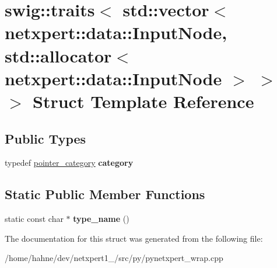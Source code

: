 \hypertarget{structswig_1_1traits_3_01std_1_1vector_3_01netxpert_1_1data_1_1InputNode_00_01std_1_1allocator_30485a0de76e92f94d67a422e53827774}{}\section{swig\+:\+:traits$<$ std\+:\+:vector$<$ netxpert\+:\+:data\+:\+:Input\+Node, std\+:\+:allocator$<$ netxpert\+:\+:data\+:\+:Input\+Node $>$ $>$ $>$ Struct Template Reference}
\label{structswig_1_1traits_3_01std_1_1vector_3_01netxpert_1_1data_1_1InputNode_00_01std_1_1allocator_30485a0de76e92f94d67a422e53827774}
\subsection*{Public Types}
\begin{DoxyCompactItemize}
\item 
typedef \hyperlink{structswig_1_1pointer__category}{pointer\+\_\+category} {\bfseries category}\hypertarget{structswig_1_1traits_3_01std_1_1vector_3_01netxpert_1_1data_1_1InputNode_00_01std_1_1allocator_30485a0de76e92f94d67a422e53827774_a1fb5a01f48bfc643e38da14af39be328}{}\label{structswig_1_1traits_3_01std_1_1vector_3_01netxpert_1_1data_1_1InputNode_00_01std_1_1allocator_30485a0de76e92f94d67a422e53827774_a1fb5a01f48bfc643e38da14af39be328}

\end{DoxyCompactItemize}
\subsection*{Static Public Member Functions}
\begin{DoxyCompactItemize}
\item 
static const char $\ast$ {\bfseries type\+\_\+name} ()\hypertarget{structswig_1_1traits_3_01std_1_1vector_3_01netxpert_1_1data_1_1InputNode_00_01std_1_1allocator_30485a0de76e92f94d67a422e53827774_ae3cfe70fb47c4ab81f92fb4e10f3fa26}{}\label{structswig_1_1traits_3_01std_1_1vector_3_01netxpert_1_1data_1_1InputNode_00_01std_1_1allocator_30485a0de76e92f94d67a422e53827774_ae3cfe70fb47c4ab81f92fb4e10f3fa26}

\end{DoxyCompactItemize}


The documentation for this struct was generated from the following file\+:\begin{DoxyCompactItemize}
\item 
/home/hahne/dev/netxpert1\+\_/src/py/pynetxpert\+\_\+wrap.\+cpp\end{DoxyCompactItemize}
